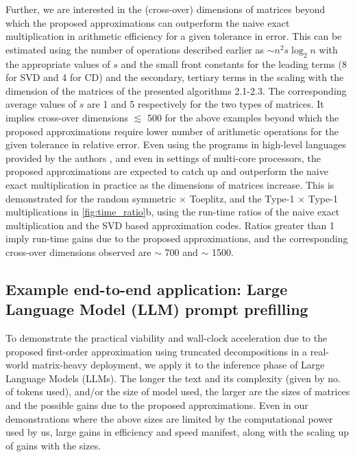 \documentclass[onefignum,onetabnum]{siamart171218}
\begin{document}
Further, we are interested in the (cross-over) dimensions of matrices beyond which the proposed approximations can outperform the naive exact multiplication in arithmetic efficiency for a given tolerance in error. This can be estimated using the number of operations described earlier as $\sim n^2 s\log_2 n$ with the appropriate values of $s$ and the small front constants for the leading terms (8 for SVD and 4 for CD) and the secondary, tertiary terms in the scaling with the dimension of the matrices of the presented algorithms 2.1-2.3. The corresponding average values of $s$ are 1 and 5 respectively for the two types of matrices. It implies cross-over dimensions $\lesssim$ 500 for the above examples beyond which the proposed approximations require lower number of arithmetic operations for the given tolerance in relative error. Even using the programs in high-level languages provided by the authors \cite{Codes}, and even in settings of multi-core processors, the proposed approximations are expected to catch up and outperform the naive exact multiplication in practice as the dimensions of matrices increase. This is demonstrated\footnotemark[5]  for the random symmetric $\times$ Toeplitz, and the Type-1 $\times$ Type-1 multiplications in \cref{fig:time_ratio}b, using the run-time ratios of the naive exact multiplication and the SVD based approximation codes. Ratios greater than 1 imply run-time gains due to the proposed approximations, and the corresponding cross-over dimensions observed are $\sim$ 700 and $\sim$ 1500.

\subsection{Example end-to-end application: Large Language Model (LLM) prompt prefilling}
\label{subsec:llm_application}

To demonstrate the practical viability and wall-clock acceleration due to the proposed first-order approximation using truncated decompositions in a real-world matrix-heavy deployment, we apply it to the inference phase of Large Language Models (LLMs). The longer the text and its complexity (given by no. of tokens used), and/or the size of model used, the larger are the sizes of matrices and the possible gains due to the proposed approximations. Even in our demonstrations where the above sizes are limited by the computational power used by us, large gains in efficiency and speed manifest, along with the scaling up of gains with the sizes.
\end{document}
